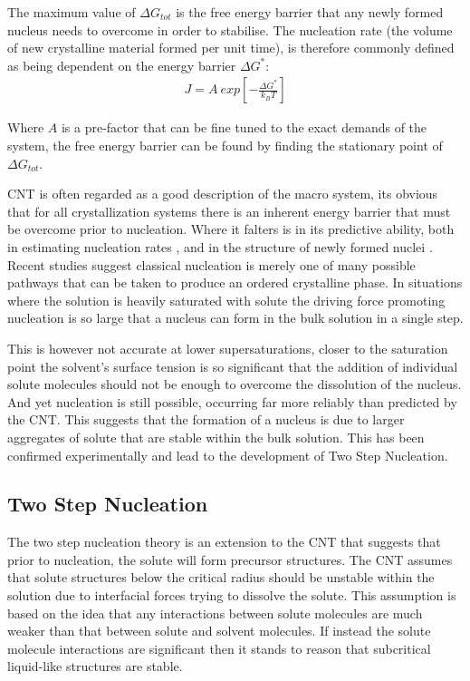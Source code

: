 The maximum value of $\Delta G_{tot}$ is the free energy barrier 
that any newly formed nucleus needs to overcome in order to stabilise. 
The nucleation rate (the volume of new crystalline material formed per 
unit time), is therefore commonly defined as being dependent on the 
energy barrier $\Delta G^*$:
\begin{align}
	J = A \ exp \left[-\frac{\Delta G^*}{k_BT} \right]
\end{align}

Where $A$ is a pre-factor that can be fine tuned to the exact 
demands of the system, the free energy barrier can be found by 
finding the stationary point of $\Delta G_{tot}$. 

CNT is often regarded as a good description of the macro system, 
its obvious that for all crystallization systems there is an 
inherent energy barrier that must be overcome prior to nucleation. 
Where it falters is in its predictive ability, both in estimating 
nucleation rates \cite{Gharibeh2005, Vekilov2010}, and in the 
structure of newly formed nuclei \cite{Lee1999, Yau2001}.
Recent studies suggest classical nucleation is merely one of 
many possible pathways that can be taken to produce an ordered 
crystalline phase. In situations where the solution is heavily 
saturated with solute the driving force promoting nucleation is 
so large that a nucleus can form in the bulk solution in a single 
step. 

This is however not accurate at lower supersaturations, closer
to the saturation point the solvent's surface tension is so 
significant that the addition of individual solute molecules
should not be enough to overcome the dissolution of the nucleus. 
And yet nucleation is still possible, occurring far more reliably
than predicted by the CNT. This suggests that the formation of 
a nucleus is due to larger aggregates of solute that are stable 
within the bulk solution. This has been confirmed experimentally 
and lead to the development of Two Step Nucleation.

\subsection{Two Step Nucleation}
The two step nucleation theory is an extension to the CNT 
that suggests that prior to nucleation, the solute will 
form precursor structures. The CNT assumes that solute 
structures below the critical radius should be unstable 
within the solution due to interfacial forces trying to 
dissolve the solute. This assumption is based on the idea 
that any interactions between solute molecules are much
weaker than that between solute and solvent molecules.
If instead the solute molecule interactions are significant
then it stands to reason that subcritical liquid-like 
structures are stable. 

